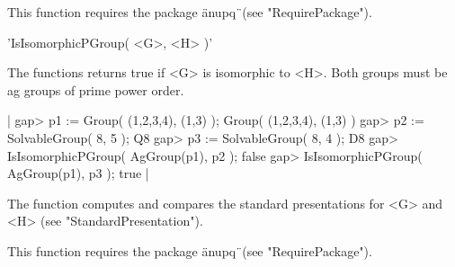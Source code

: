 This function requires the package \"anupq\"\ (see "RequirePackage").


'IsIsomorphicPGroup( <G>, <H> )'

The functions returns true if <G> is isomorphic to <H>.  Both groups must
be ag groups of prime power order.

|    gap> p1 := Group( (1,2,3,4), (1,3) );
    Group( (1,2,3,4), (1,3) )
    gap> p2 := SolvableGroup( 8, 5 );
    Q8
    gap> p3 := SolvableGroup( 8, 4 );
    D8
    gap> IsIsomorphicPGroup( AgGroup(p1), p2 );
    false
    gap> IsIsomorphicPGroup( AgGroup(p1), p3 );
    true |

The function computes and compares the standard presentations for <G> and
<H> (see "StandardPresentation").

This function requires the package \"anupq\"\ (see "RequirePackage").

